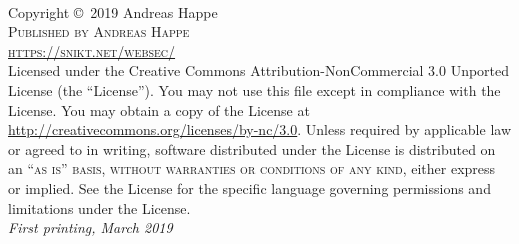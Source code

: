 \documentclass[11pt,fleqn]{book} %
\begin{document}

\begingroup
\thispagestyle{empty} %
\vfill
\endgroup


\newpage
~\vfill
\thispagestyle{empty}

\noindent Copyright \copyright\ 2019 Andreas Happe\\ %

\noindent \textsc{Published by Andreas Happe}\\ %

\noindent \textsc{\url{https://snikt.net/websec/}}\\ %

\noindent Licensed under the Creative Commons Attribution-NonCommercial 3.0 Unported License (the ``License''). You may not use this file except in compliance with the License. You may obtain a copy of the License at \url{http://creativecommons.org/licenses/by-nc/3.0}. Unless required by applicable law or agreed to in writing, software distributed under the License is distributed on an \textsc{``as is'' basis, without warranties or conditions of any kind}, either express or implied. See the License for the specific language governing permissions and limitations under the License.\\ %

\noindent \textit{First printing, March 2019} %
\end{document}

